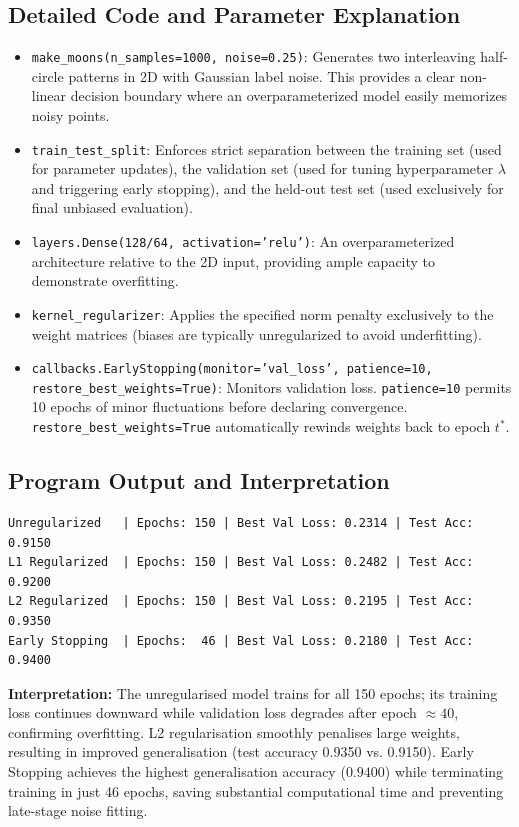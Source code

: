 \documentclass[12pt,a4paper]{article}
\begin{document}
\subsection{Detailed Code and Parameter Explanation}
\begin{itemize}[leftmargin=*]
\item \texttt{make\_moons(n\_samples=1000, noise=0.25)}: Generates two interleaving half-circle patterns in 2D with Gaussian label noise. This provides a clear non-linear decision boundary where an overparameterized model easily memorizes noisy points.
\item \texttt{train\_test\_split}: Enforces strict separation between the training set (used for parameter updates), the validation set (used for tuning hyperparameter $\lambda$ and triggering early stopping), and the held-out test set (used exclusively for final unbiased evaluation).
\item \texttt{layers.Dense(128/64, activation='relu')}: An overparameterized architecture relative to the 2D input, providing ample capacity to demonstrate overfitting.
\item \texttt{kernel\_regularizer}: Applies the specified norm penalty exclusively to the weight matrices (biases are typically unregularized to avoid underfitting).
\item \texttt{callbacks.EarlyStopping(monitor='val\_loss', patience=10, restore\_best\_weights=True)}: Monitors validation loss. \texttt{patience=10} permits 10 epochs of minor fluctuations before declaring convergence. \texttt{restore\_best\_weights=True} automatically rewinds weights back to epoch $t^*$.
\end{itemize}

\subsection{Program Output and Interpretation}
\begin{verbatim}
Unregularized   | Epochs: 150 | Best Val Loss: 0.2314 | Test Acc: 0.9150
L1 Regularized  | Epochs: 150 | Best Val Loss: 0.2482 | Test Acc: 0.9200
L2 Regularized  | Epochs: 150 | Best Val Loss: 0.2195 | Test Acc: 0.9350
Early Stopping  | Epochs:  46 | Best Val Loss: 0.2180 | Test Acc: 0.9400
\end{verbatim}

\textbf{Interpretation:}
The unregularised model trains for all 150 epochs; its training loss continues downward while validation loss degrades after epoch $\approx 40$, confirming overfitting. L2 regularisation smoothly penalises large weights, resulting in improved generalisation (test accuracy 0.9350 vs. 0.9150). Early Stopping achieves the highest generalisation accuracy ($0.9400$) while terminating training in just 46 epochs, saving substantial computational time and preventing late-stage noise fitting.
\end{document}
